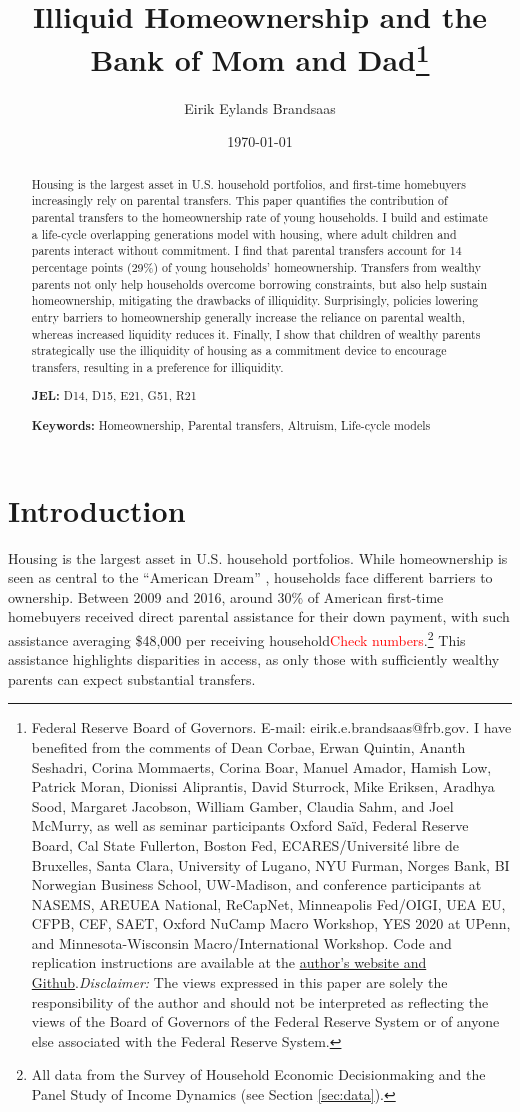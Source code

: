 \documentclass[12pt]{article}
\title{{\LARGE Illiquid Homeownership and the \\ Bank of Mom and Dad}\thanks{Federal Reserve Board of Governors. E-mail: eirik.e.brandsaas@frb.gov. I have benefited from the comments of Dean Corbae, Erwan Quintin, Ananth Seshadri, Corina Mommaerts, Corina Boar, Manuel Amador, Hamish Low, Patrick Moran, Dionissi Aliprantis, David Sturrock, Mike Eriksen, Aradhya Sood, Margaret Jacobson, William Gamber, Claudia Sahm, and Joel McMurry, as well as seminar participants Oxford Sa{\"i}d, Federal Reserve Board, Cal State Fullerton, Boston Fed, ECARES/Université libre de Bruxelles, Santa Clara, University of Lugano, NYU Furman, Norges Bank, BI Norwegian Business School, UW-Madison, and conference participants at NASEMS, AREUEA National, ReCapNet, Minneapolis Fed/OIGI, UEA EU, CFPB, CEF, SAET, Oxford NuCamp Macro Workshop, YES 2020 at UPenn, and Minnesota-Wisconsin Macro/International Workshop. Code and replication instructions are available at the \href{https://github.com/eirikbrandsaas/HomeownershipBankMomDad.jl}{author's  website and Github}.\newline \textit{Disclaimer: }The views expressed in this paper are solely the responsibility of the author and should not be interpreted as reflecting the views of the Board of Governors of the Federal Reserve System or of anyone else associated with the Federal Reserve System.}}
\author{Eirik Eylands Brandsaas}
\date{{\today }}
\begin{document}
\maketitle
\begin{abstract}
{\begin{spacing}{1.2}
Housing is the largest asset in U.S. household portfolios, and first-time homebuyers increasingly rely on parental transfers. This paper quantifies the contribution of parental transfers to the homeownership rate of young households. I build and estimate a life-cycle overlapping generations model with housing, where adult children and parents interact without commitment. I find that parental transfers account for 14 percentage points (29\%) of young households' homeownership. Transfers from wealthy parents not only help households overcome borrowing constraints, but also help sustain homeownership, mitigating the drawbacks of illiquidity. Surprisingly, policies lowering entry barriers to homeownership generally increase the reliance on parental wealth, whereas increased liquidity reduces it. Finally, I show that children of wealthy parents strategically use the illiquidity of housing as a commitment device to encourage transfers, resulting in a preference for illiquidity.
\end{spacing}}
\vspace{0.5cm}
\noindent \textbf{JEL:} D14, D15, E21, G51, R21

\noindent \textbf{Keywords:} Homeownership, Parental transfers, Altruism, Life-cycle models

\end{abstract}
\newpage
\onehalfspacing

\section{Introduction}
Housing is the largest asset in U.S. household portfolios. While homeownership is seen as central to the ``American Dream'' \citep{goodman2018homeownership}, households face different barriers to ownership. Between 2009 and 2016, around 30\% of American first-time homebuyers received direct parental assistance for their down payment, with such assistance averaging \$48,000 per receiving household\textcolor{red}{Check numbers}.\footnote{All data from the Survey of Household Economic Decisionmaking and the Panel Study of Income Dynamics (see Section \ref{sec:data}).} This assistance highlights disparities in access, as only those with sufficiently wealthy parents can expect substantial transfers.
\end{document}
